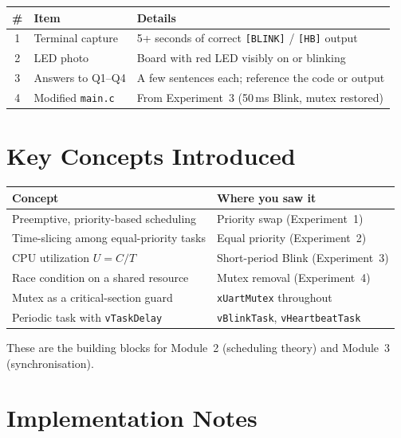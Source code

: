 \documentclass[11pt, a4paper]{article}
\newcommand{\file}[1]{\texttt{\small #1}}
\newcommand{\api}[1]{\texttt{\small #1}}
\begin{document}
\renewcommand{\arraystretch}{1.3}
\begin{tabular}{@{} c p{4cm} p{8cm} @{}}
  \toprule
  \textbf{\#} & \textbf{Item} & \textbf{Details} \\
  \midrule
  1 & Terminal capture    & 5+ seconds of correct \texttt{[BLINK]} / \texttt{[HB]} output \\
  2 & LED photo           & Board with red LED visibly on or blinking \\
  3 & Answers to Q1--Q4  & A few sentences each; reference the code or output \\
  4 & Modified \file{main.c} & From Experiment~3 (50\,ms Blink, mutex restored) \\
  \bottomrule
\end{tabular}
\renewcommand{\arraystretch}{1}

\section{Key Concepts Introduced}

\renewcommand{\arraystretch}{1.3}
\begin{tabular}{@{} p{6.5cm} p{7cm} @{}}
  \toprule
  \textbf{Concept} & \textbf{Where you saw it} \\
  \midrule
  Preemptive, priority-based scheduling    & Priority swap (Experiment~1) \\
  Time-slicing among equal-priority tasks  & Equal priority (Experiment~2) \\
  CPU utilization $U = C/T$               & Short-period Blink (Experiment~3) \\
  Race condition on a shared resource      & Mutex removal (Experiment~4) \\
  Mutex as a critical-section guard        & \api{xUartMutex} throughout \\
  Periodic task with \api{vTaskDelay}      & \texttt{vBlinkTask}, \texttt{vHeartbeatTask} \\
  \bottomrule
\end{tabular}
\renewcommand{\arraystretch}{1}

\medskip
These are the building blocks for Module~2 (scheduling theory) and Module~3
(synchronisation).

\section{Implementation Notes}
\end{document}
